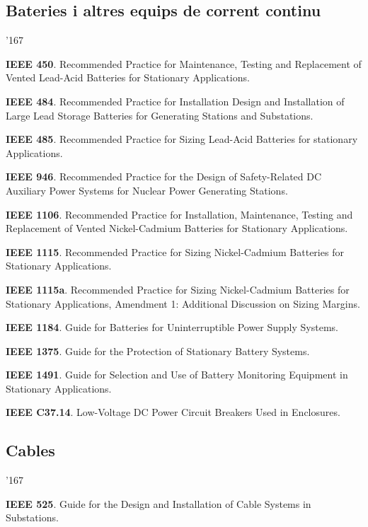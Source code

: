 \subsection*{Bateries i altres equips de corrent continu}
\begin{dinglist}{'167}
    \item \textbf{IEEE 450}. Recommended Practice for  Maintenance, Testing and Replacement of Vented Lead-Acid Batteries for Stationary Applications.
    \item \textbf{IEEE 484}. Recommended Practice for Installation Design and Installation of Large Lead Storage Batteries for Generating Stations and Substations.
    \item \textbf{IEEE 485}. Recommended Practice for Sizing Lead-Acid Batteries for stationary Applications.
    \item \textbf{IEEE 946}. Recommended Practice for the Design of Safety-Related DC Auxiliary Power Systems for Nuclear Power Generating Stations.
    \item \textbf{IEEE 1106}. Recommended Practice for Installation, Maintenance, Testing and Replacement of Vented Nickel-Cadmium Batteries for Stationary Applications.
    \item \textbf{IEEE 1115}. Recommended Practice for Sizing Nickel-Cadmium Batteries for Stationary Applications.
    \item \textbf{IEEE 1115a}. Recommended Practice for Sizing Nickel-Cadmium Batteries for Stationary Applications, Amendment 1: Additional Discussion on Sizing Margins.
    \item \textbf{IEEE 1184}. Guide for Batteries for Uninterruptible Power Supply Systems.
    \item \textbf{IEEE 1375}. Guide for the Protection of Stationary Battery Systems.
    \item \textbf{IEEE 1491}. Guide for Selection and Use of Battery Monitoring Equipment in Stationary Applications.
    \item \textbf{IEEE C37.14}. Low-Voltage DC Power Circuit Breakers Used in Enclosures.
\end{dinglist}


\subsection*{Cables}
\begin{dinglist}{'167}
    \item \textbf{IEEE 525}. Guide for the Design and Installation of Cable Systems in Substations.
\end{dinglist}

